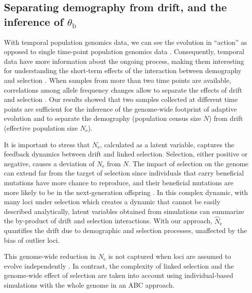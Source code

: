 \documentclass[a4paper, 12pt]{article}
\begin{document}
\subsection*{Separating demography from drift, and the inference of $\theta_{\mathrm{b}}$}

With temporal population genomics data, we can see the evolution in ``action'' as opposed to single time-point population genomics data \citep{Feder:2021bt}. Consequently, temporal data have more information about the ongoing process, making them interesting for understanding the short-term effects of the interaction between demography and selection \citep{Buffalo:2019ab, Dehasque:2020ku, Williams:2020gk}. When samples from more than two time points are available, correlations among allele frequency changes allow to separate the effects of drift and selection \citep[e.g.,][]{Buffalo:2020hq, Feder:2014fe}. Our results showed that two samples collected at different time points are sufficient for the inference of the genome-wide footprint of adaptive evolution and to separate the demography (population census size $N$) from drift (effective population size $N_{\mathrm{e}}$). 

It is important to stress that $N_{\mathrm{e}}$, calculated as a latent variable, captures the feedback dynamics between drift and linked selection. Selection, either positive or negative, causes a deviation of $N_\mathrm{e}$ from $N$. The impact of selection on the genome can extend far from the target of selection since individuals that carry beneficial mutations have more chance to reproduce, and their beneficial mutations are more likely to be in the next-generation offspring \citep{Walsh:2018tv}. In this complex dynamic, with many loci under selection which creates a dynamic that cannot be easily described analytically, latent variables obtained from simulations can summarize the by-product of drift and selection interactions. With our approach, $\hat N_\mathrm{e}$ quantifies the drift due to demographic and selection processes, unaffected by the bias of outlier loci.

This genome-wide reduction in $N_{\mathrm{e}}$ is not captured when loci are assumed to evolve independently \citep[as in][for example]{Sheehan:2016caa, Laval:2019jo}. In contrast, the complexity of linked selection and the genome-wide effect of selection are taken into account using individual-based simulations with the whole genome in an ABC approach. 
\end{document}
